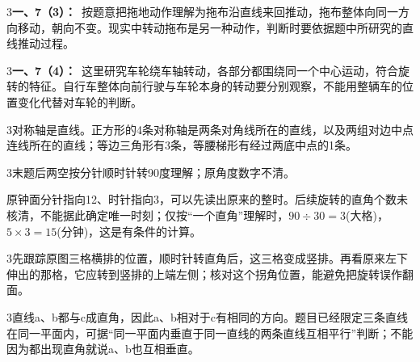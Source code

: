 \documentclass[multi=snippet,border={5bp 20bp 5bp 5bp}]{standalone}
\newenvironment{snippet}[3]{\begin{minipage}{#1bp}\color{answerred}\fontsize{#2}{#3}\selectfont\raggedright}{\end{minipage}}
\begin{document}
\begin{snippet}{505}{11.5}{14}\begin{multicols}{3}\raggedcolumns \textbf{一、7（3）：}\ 按题意把拖地动作理解为拖布沿直线来回推动，拖布整体向同一方向移动，朝向不变。现实中转动拖布是另一种动作，判断时要依据题中所研究的直线推动过程。\end{multicols}\end{snippet}
\begin{snippet}{505}{11.5}{14}\begin{multicols}{3}\raggedcolumns \textbf{一、7（4）：}\ 这里研究车轮绕车轴转动，各部分都围绕同一个中心运动，符合旋转的特征。自行车整体向前行驶与车轮本身的转动要分别观察，不能用整辆车的位置变化代替对车轮的判断。\end{multicols}\end{snippet}
\begin{snippet}{505}{11.5}{14}\begin{multicols}{3}\raggedcolumns 对称轴是直线。正方形的4条对称轴是两条对角线所在的直线，以及两组对边中点连线所在的直线；等边三角形有3条，等腰梯形有经过两底中点的1条。\end{multicols}\end{snippet}
\begin{snippet}{505}{11.5}{14}\begin{multicols}{3}\raggedcolumns 末题后两空按分针顺时针转90度理解；原角度数字不清。\par 原钟面分针指向12、时针指向3，可以先读出原来的整时。后续旋转的直角个数未核清，不能据此确定唯一时刻；仅按“一个直角”理解时，\(90\div30=3\)\allowbreak (大格)，\(5\times3=15\)\allowbreak (分钟)，这是有条件的计算。\end{multicols}\end{snippet}
\begin{snippet}{505}{11.5}{14}\begin{multicols}{3}\raggedcolumns 先跟踪原图三格横排的位置，顺时针转直角后，这三格变成竖排。再看原来左下伸出的那格，它应转到竖排的上端左侧；核对这个拐角位置，能避免把旋转误作翻面。\end{multicols}\end{snippet}
\begin{snippet}{505}{11.5}{14}\begin{multicols}{3}\raggedcolumns 直线a、b都与c成直角，因此a、b相对于c有相同的方向。题目已经限定三条直线在同一平面内，可据“同一平面内垂直于同一直线的两条直线互相平行”判断；不能因为都出现直角就说a、b也互相垂直。\end{multicols}\end{snippet}
\end{document}
